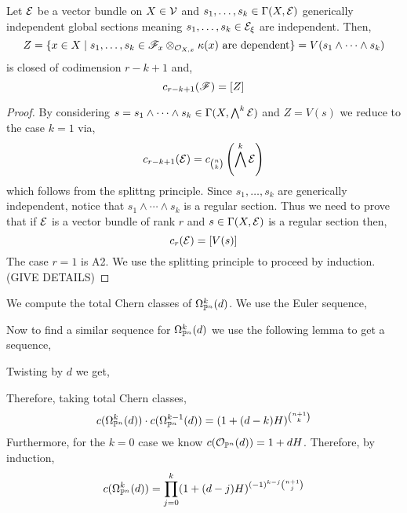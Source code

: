 \documentclass[12pt]{article}
\begin{document}
\begin{prop}
Let $\E$ be a vector bundle on $X \in \cV$ and $s_1, \dots, s_k \in \Gamma(X, \E)$ generically independent global sections meaning $s_1, \dots, s_k \in \E_\xi$ are independent. Then,
\[ Z = \{ x \in X \mid s_1, \dots, s_k \in \F_x \otimes_{\stalk{X}{x}} \kappa(x) \text{ are dependent} \} = V(s_1 \wedge \cdots \wedge s_k) \]
is closed of codimension $r - k + 1$ and,
\[ c_{r - k + 1}(\F) = [Z] \]
\end{prop}

\begin{proof}
By considering $s = s_1 \wedge \cdots \wedge s_k \in \Gamma(X, \bigwedge^k \E)$ and $Z = V(s)$ we reduce to the case $k = 1$ via,
\[ c_{r-k+1}(\E) = c_{{n \choose k}} \left(\bigwedge^k \E\right) \]
which follows from the splittng principle. Since $s_1, \dots, s_k$ are generically independent, notice that $s_1 \wedge \cdots \wedge s_k$ is a regular section. Thus we need to prove that if $\E$ is a vector bundle of rank $r$ and $s \in \Gamma(X, \E)$ is a regular section then,
\[ c_r(\E) = [V(s)] \]
The case $r = 1$ is A2. We use the splitting principle to proceed by induction. (GIVE DETAILS)
\end{proof}

\begin{example}
We compute the total Chern classes of $\Omega^k_{\P^n}(d)$. We use the Euler sequence,
\begin{center}
\end{center}
Now to find a similar sequence for $\Omega^k_{\P^n}(d)$ we use the following lemma to get a sequence,
\begin{center}
\end{center}
Twisting by $d$ we get,
\begin{center}
\end{center}
Therefore, taking total Chern classes,
\[ c(\Omega^k_{\P^n}(d)) \cdot c(\Omega^{k-1}_{\P^n}(d)) = (1 + (d - k) H)^{{n + 1 \choose k }} \] 
Furthermore, for the $k = 0$ case we know $c(\struct{\P^n}(d)) = 1 + d H$. Therefore, by induction,
\[ c(\Omega^k_{\P^n}(d)) = \prod_{j = 0}^k (1 + (d - j) H)^{(-1)^{k-j} { n + 1 \choose j }} \]
\end{example}
\end{document}
